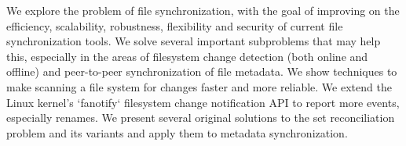 \documentclass[12pt,a4paper]{report}
\begin{document}
We explore the problem of file synchronization, with the goal of improving on
the efficiency, scalability, robustness, flexibility and security of current
file synchronization tools. We solve several important subproblems that may
help this, especially in the areas of filesystem change detection (both
online and offline) and peer-to-peer synchronization of file metadata.  We
show techniques to make scanning a file system for changes faster and more
reliable.  We extend the Linux kernel's `fanotify` filesystem change
notification API to report more events, especially renames. We present
several original solutions to the set reconciliation problem and its variants
and apply them to metadata synchronization.
\end{document}
